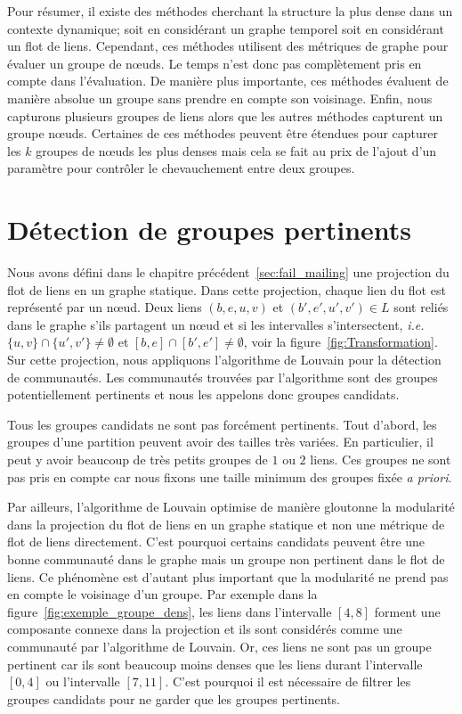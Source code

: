 \bigskip

Pour résumer, il existe des méthodes cherchant la structure la plus dense dans un contexte dynamique; soit en considérant un graphe temporel soit en considérant un flot de liens.
Cependant, ces méthodes utilisent des métriques de graphe pour évaluer un groupe de n\oe{}uds.
Le temps n'est donc pas complètement pris en compte dans l'évaluation.
De manière plus importante, ces méthodes évaluent de manière absolue un groupe sans prendre en compte son voisinage.
Enfin, nous capturons plusieurs groupes de liens alors que les autres méthodes capturent un groupe n\oe{}uds.
Certaines de ces méthodes peuvent être étendues pour capturer les $k$ groupes de n\oe{}uds les plus denses mais cela se fait au prix de l'ajout d'un paramètre pour contrôler le chevauchement entre deux groupes.


\section{Détection de groupes pertinents}
\label{sec:groupe_dense_method}

Nous avons défini dans le chapitre précédent~\ref{sec:fail_mailing} une projection du flot de liens en un graphe statique.
Dans cette projection, chaque lien du flot est représenté par un n\oe{}ud.
Deux liens $(b,e,u,v)$ et $(b',e',u',v') \in L$ sont reliés dans le graphe s'ils partagent un n\oe{}ud et si les intervalles s'intersectent, \emph{i.e.} $\{u,v\} \cap \{u',v'\} \neq \emptyset$ et $[b,e]\cap[b',e'] \neq \emptyset$, voir la figure~\ref{fig:Transformation}.
Sur cette projection, nous appliquons l'algorithme de Louvain pour la détection de communautés.
Les communautés trouvées par l'algorithme sont des groupes potentiellement pertinents et nous les appelons donc groupes candidats.

Tous les groupes candidats ne sont pas forcément pertinents.
Tout d'abord, les groupes d'une partition peuvent avoir des tailles très variées.
En particulier, il peut y avoir beaucoup de très petits groupes de $1$ ou $2$ liens.
Ces groupes ne sont pas pris en compte car nous fixons une taille minimum des groupes fixée \emph{a priori}.

Par ailleurs, l'algorithme de Louvain optimise de manière gloutonne la modularité dans la projection du flot de liens en un graphe statique et non une métrique de flot de liens directement.
C'est pourquoi certains candidats peuvent être une bonne communauté dans le graphe mais un groupe non pertinent dans le flot de liens.
Ce phénomène est d'autant plus important que la modularité ne prend pas en compte le voisinage d'un groupe.
Par exemple dans la figure~\ref{fig:exemple_groupe_dens}, les liens dans l'intervalle $[4,8]$ forment une composante connexe dans la projection et ils sont considérés comme une communauté par l'algorithme de Louvain.
Or, ces liens ne sont pas un groupe pertinent car ils sont beaucoup moins denses que les liens durant l'intervalle $[0,4]$ ou l'intervalle $[7,11]$.
C'est pourquoi il est nécessaire de filtrer les groupes candidats pour ne garder que les groupes pertinents.




